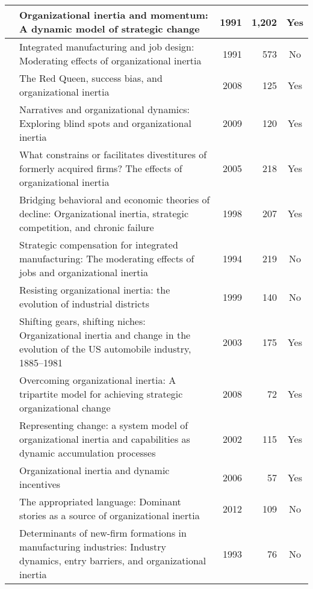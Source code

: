 \begin{longtable}{
    |>{\raggedright\arraybackslash}p{3.7cm}
    |>{\raggedright\arraybackslash}p{3.7cm}
    |r
    |r
    |c
    |}
    \cite{kelly1991organizational} & Organizational inertia and momentum: A dynamic model of strategic change & 1991 & 1,202 & Yes \\
	\hline 
    \cite{dean1991integrated}      & Integrated manufacturing and job design: Moderating effects of organizational inertia & 1991 & 573 & No \\
	\hline 
    \cite{barnett2008red} & The Red Queen, success bias, and organizational inertia & 2008 & 125 & Yes \\
	\hline 
    \cite{geiger2009narratives} & Narratives and organizational dynamics: Exploring blind spots and organizational inertia & 2009 & 120 & Yes \\
	\hline 
    \cite{shimizu2005constrains} & What constrains or facilitates divestitures of formerly acquired firms? The effects of organizational inertia & 2005 & 218 & Yes \\
	\hline 
    \cite{van1998bridging} & Bridging behavioral and economic theories of decline: Organizational inertia, strategic competition, and chronic failure & 1998 & 207 & Yes \\
	\hline 
    \cite{snell1994strategic} & Strategic compensation for integrated manufacturing: The moderating effects of jobs and organizational inertia & 1994 & 219 & No \\
	\hline 
    \cite{lazerson1999resisting} & Resisting organizational inertia: the evolution of industrial districts & 1999 & 140 & No \\
	\hline 
    \cite{dobrev2003shifting} & Shifting gears, shifting niches: Organizational inertia and change in the evolution of the US automobile industry, 1885--1981 & 2003 & 175 & Yes \\
	\hline 
    \cite{godkin2008overcoming} & Overcoming organizational inertia: A tripartite model for achieving strategic organizational change & 2008 & 72 & Yes \\
	\hline 
    \cite{larsen2002representing} & Representing change: a system model of organizational inertia and capabilities as dynamic accumulation processes & 2002 & 115 & Yes \\
	\hline 
    \cite{boyer2006organizational} & Organizational inertia and dynamic incentives & 2006 & 57 & Yes \\
	\hline 
    \cite{naslund2012appropriated} & The appropriated language: Dominant stories as a source of organizational inertia & 2012 & 109 & No \\
	\hline 
    \cite{dean1993determinants} & Determinants of new-firm formations in manufacturing industries: Industry dynamics, entry barriers, and organizational inertia & 1993 & 76 & No \\

\end{longtable}
